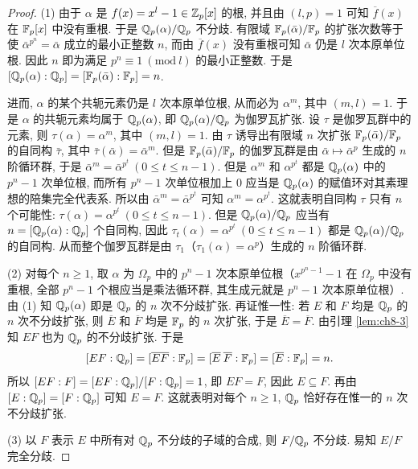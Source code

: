 \begin{proof}
(1) 由于 $\alpha$ 是 $f(x)=x^l-1\in\mathbb{Z}_p[x]$ 的根, 并且由 $(l,p)=1$ 可知 $\overline{f}(x)$ 在 $\mathbb{F}_p[x]$ 中没有重根. 于是 $\mathbb{Q}_p(\alpha)/\mathbb{Q}_p$ 不分歧. 有限域 $\mathbb{F}_p(\bar{\alpha})/\mathbb{F}_p$ 的扩张次数等于使 $\bar{\alpha}^{p^n}=\bar{\alpha}$ 成立的最小正整数 $n$, 而由 $\overline{f}(x)$ 没有重根可知 $\bar{\alpha}$ 仍是 $l$ 次本原单位根. 因此 $n$ 即为满足 $p^n\equiv 1\ (\mathrm{mod}\ l)$ 的最小正整数. 于是 $[\mathbb{Q}_p(\alpha):\mathbb{Q}_p]=[\mathbb{F}_p(\bar{\alpha}):\mathbb{F}_p]=n$.

进而, $\alpha$ 的某个共轭元素仍是 $l$ 次本原单位根, 从而必为 $\alpha^m$, 其中 $(m,l)=1$. 于是 $\alpha$ 的共轭元素均属于 $\mathbb{Q}_p(\alpha)$, 即 $\mathbb{Q}_p(\alpha)/\mathbb{Q}_p$ 为伽罗瓦扩张. 设 $\tau$ 是伽罗瓦群中的元素, 则 $\tau(\alpha)=\alpha^m$, 其中 $(m,l)=1$. 由 $\tau$ 诱导出有限域 $n$ 次扩张 $\mathbb{F}_p(\bar{\alpha})/\mathbb{F}_p$ 的自同构 $\bar{\tau}$, 其中 $\bar{\tau}(\bar{\alpha})=\bar{\alpha}^m$. 但是 $\mathbb{F}_p(\bar{\alpha})/\mathbb{F}_p$ 的伽罗瓦群是由 $\bar{\alpha}\mapsto\bar{\alpha}^p$ 生成的 $n$ 阶循环群, 于是 $\bar{\alpha}^m=\bar{\alpha}^{p^t}\ (0\leqslant t\leqslant n-1)$. 但是 $\alpha^m$ 和 $\alpha^{p^t}$ 都是 $\mathbb{Q}_p(\alpha)$ 中的 $p^n-1$ 次单位根, 而所有 $p^n-1$ 次单位根加上 $0$ 应当是 $\mathbb{Q}_p(\alpha)$ 的赋值环对其素理想的陪集完全代表系. 所以由 $\bar{\alpha}^m=\bar{\alpha}^{p^t}$ 可知 $\alpha^m=\alpha^{p^t}$. 这就表明自同构 $\tau$ 只有 $n$ 个可能性: $\tau(\alpha)=\alpha^{p^t}\ (0\leqslant t\leqslant n-1)$. 但是 $\mathbb{Q}_p(\alpha)/\mathbb{Q}_p$ 应当有 $n=[\mathbb{Q}_p(\alpha):\mathbb{Q}_p]$ 个自同构, 因此 $\tau_t(\alpha)=\alpha^{p^t}\ (0\leqslant t\leqslant n-1)$ 都是 $\mathbb{Q}_p(\alpha)/\mathbb{Q}_p$ 的自同构. 从而整个伽罗瓦群是由 $\tau_1$（$\tau_1(\alpha)=\alpha^p$）生成的 $n$ 阶循环群.

(2) 对每个 $n\geqslant 1$, 取 $\alpha$ 为 $\Omega_p$ 中的 $p^n-1$ 次本原单位根（$x^{p^n-1}-1$ 在 $\Omega_p$ 中没有重根, 全部 $p^n-1$ 个根应当是乘法循环群, 其生成元就是 $p^n-1$ 次本原单位根）. 由 (1) 知 $\mathbb{Q}_p(\alpha)$ 即是 $\mathbb{Q}_p$ 的 $n$ 次不分歧扩张. 再证惟一性: 若 $E$ 和 $F$ 均是 $\mathbb{Q}_p$ 的 $n$ 次不分歧扩张, 则 $\overline{E}$ 和 $\overline{F}$ 均是 $\mathbb{F}_p$ 的 $n$ 次扩张, 于是 $\overline{E}=\overline{F}$. 由引理 \ref{lem:ch8-3} 知 $EF$ 也为 $\mathbb{Q}_p$ 的不分歧扩张. 于是
\[
  [EF:\mathbb{Q}_p]=[\overline{EF}:\mathbb{F}_p]=[\overline{E}\:\overline{F}:\mathbb{F}_p]=[\overline{E}:\mathbb{F}_p]=n.
\]
所以 $[EF:F]=[EF:\mathbb{Q}_p]/[F:\mathbb{Q}_p]=1$, 即 $EF=F$, 因此 $E\subseteq F$. 再由 $[E:\mathbb{Q}_p]=[F:\mathbb{Q}_p]$ 可知 $E=F$. 这就表明对每个 $n\geqslant 1$, $\mathbb{Q}_p$ 恰好存在惟一的 $n$ 次不分歧扩张.

(3) 以 $F$ 表示 $E$ 中所有对 $\mathbb{Q}_p$ 不分歧的子域的合成, 则 $F/\mathbb{Q}_p$ 不分歧. 易知 $E/F$ 完全分歧.
\end{proof}

